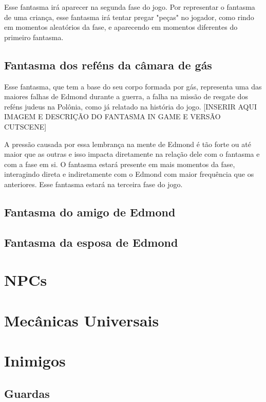 \documentclass[12pt]{article}
\begin{document}
 Esse fantasma irá aparecer na segunda fase do jogo. Por representar o fantasma de uma criança, esse fantasma irá tentar pregar "peças" no jogador, como rindo em momentos aleatórios da fase, e  aparecendo em momentos diferentes do primeiro fantasma.
 
\subsection{Fantasma dos reféns da câmara de gás}
Esse fantasma, que tem a base do seu corpo formada por gás, representa uma das maiores falhas de Edmond durante a guerra, a falha na missão de resgate dos reféns judeus na Polônia, como já relatado na história do jogo. [INSERIR AQUI IMAGEM E DESCRIÇÃO DO FANTASMA IN GAME E VERSÃO CUTSCENE]

A pressão causada por essa lembrança na mente de Edmond é tão forte ou até maior que as outras e isso impacta diretamente na relação dele com o fantasma e com a fase em si. O fantasma estará presente em mais momentos da fase, interagindo direta e indiretamente com o Edmond com maior frequência que os anteriores. Esse fantasma estará na terceira fase do jogo.

\subsection{Fantasma do amigo de Edmond}


\subsection{Fantasma da esposa de Edmond}

\subsection{}

\section{NPCs}
\section{Mecânicas Universais}
\section{Inimigos}
\subsection{Guardas}
\end{document}
